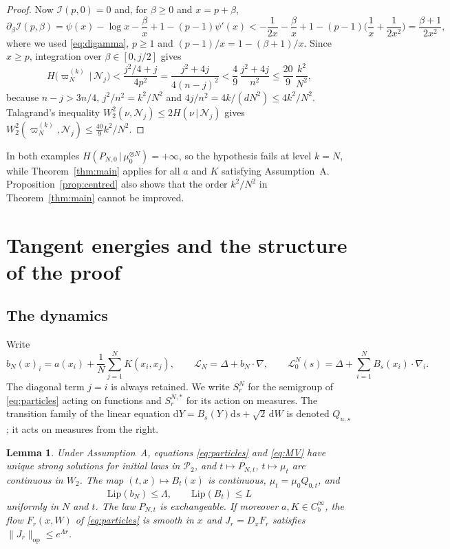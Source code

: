 \documentclass[11pt]{amsart}
\numberwithin{equation}{section}
\theoremstyle{plain}
\newtheorem{lemma}[theorem]{Lemma}
\theoremstyle{remark}
\newcommand{\cP}{\mathcal{P}}
\newcommand{\cL}{\mathcal{L}}
\newcommand{\cN}{\mathcal{N}}
\newcommand{\W}{W_2}
\newcommand{\op}{\mathrm{op}}
\newcommand{\Lip}{\mathrm{Lip}}
\newcommand{\dd}{\mathrm{d}}
\begin{document}
\begin{proof}
Now $\mathcal I(p,0)=0$ and, for $\beta\ge0$ and $x=p+\beta$,
\[
\partial_\beta\mathcal I(p,\beta)=\psi(x)-\log x-\frac\beta x+1-(p-1)\psi'(x)<-\frac1{2x}-\frac\beta x+1-(p-1)\Big(\frac1x+\frac1{2x^2}\Big)=\frac{\beta+1}{2x^2},
\]
where we used \eqref{eq:digamma}, $p\ge1$ and $(p-1)/x=1-(\beta+1)/x$. Since $x\ge p$, integration over $\beta\in[0,j/2]$ gives
\[
H\big(\varpi_N^{(k)}\,\big|\,\cN_j\big)<\frac{j^2/4+j}{4p^2}=\frac{j^2+4j}{4(n-j)^2}<\frac49\,\frac{j^2+4j}{n^2}\le\frac{20}9\,\frac{k^2}{N^2},
\]
because $n-j>3n/4$, $j^2/n^2=k^2/N^2$ and $4j/n^2=4k/(dN^2)\le4k^2/N^2$. Talagrand's inequality $\W^2(\nu,\cN_j)\le2H(\nu\,|\,\cN_j)$ \cite{Tal96} gives $\W^2(\varpi_N^{(k)},\cN_j)\le\frac{40}9k^2/N^2$.
\end{proof}

In both examples $H(P_{N,0}\,|\,\mu_0^{\otimes N})=+\infty$, so the hypothesis \cite[(2.6)]{Lac23} fails at level $k=N$, while Theorem~\ref{thm:main} applies for all $a$ and $K$ satisfying Assumption~A. Proposition~\ref{prop:centred} also shows that the order $k^2/N^2$ in Theorem~\ref{thm:main} cannot be improved.

\section{Tangent energies and the structure of the proof}\label{sec:structure}

\subsection{The dynamics}
Write
\begin{equation}\label{eq:generators}
b_N(x)_i=a(x_i)+\frac1N\sum_{j=1}^NK(x_i,x_j),\qquad \cL_N=\Delta+b_N\cdot\nabla,\qquad \cL^N_0(s)=\Delta+\sum_{i=1}^NB_s(x_i)\cdot\nabla_i.
\end{equation}
The diagonal term $j=i$ is always retained. We write $S^N_r$ for the semigroup of \eqref{eq:particles} acting on functions and $S^{N,*}_r$ for its action on measures. The transition family of the linear equation $\dd Y=B_s(Y)\dd s+\sqrt2\,\dd W$ is denoted $Q_{u,s}$; it acts on measures from the right.

\begin{lemma}\label{lem:wellposed}
Under Assumption~A, equations \eqref{eq:particles} and \eqref{eq:MV} have unique strong solutions for initial laws in $\cP_2$, and $t\mapsto P_{N,t}$, $t\mapsto\mu_t$ are continuous in $\W$. The map $(t,x)\mapsto B_t(x)$ is continuous, $\mu_t=\mu_0Q_{0,t}$, and
\begin{equation}\label{eq:lip}
\Lip(b_N)\le\Lambda,\qquad \Lip(B_t)\le L
\end{equation}
uniformly in $N$ and $t$. The law $P_{N,t}$ is exchangeable. If moreover $a,K\in C^\infty_b$, the flow $F_r(x,W)$ of \eqref{eq:particles} is smooth in $x$ and $J_r=D_xF_r$ satisfies $\|J_r\|_\op\le e^{\Lambda r}$.
\end{lemma}
\end{document}
